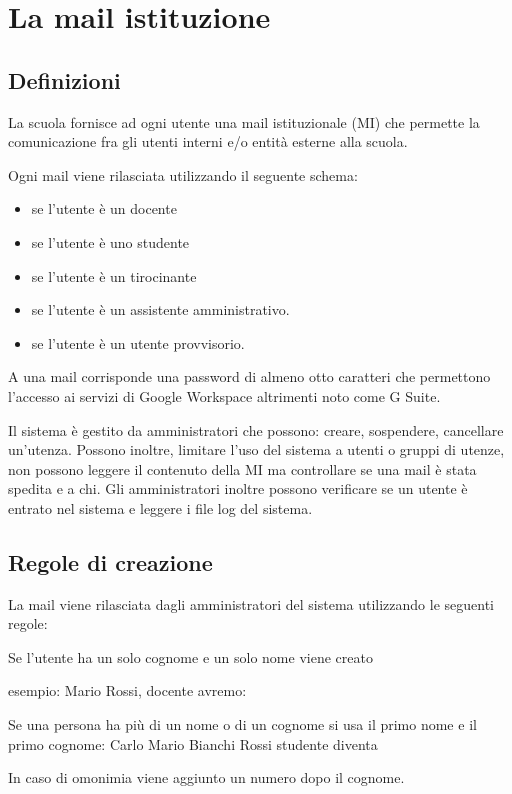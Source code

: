 \chapter{La mail istituzione}
\section{Definizioni}
La scuola fornisce ad ogni utente una mail istituzionale (MI) che permette 
la comunicazione fra gli utenti interni e/o entità esterne alla scuola.

Ogni mail viene rilasciata utilizzando il seguente schema:
\begin{itemize}
	\item {} se l'utente è un docente
	\item {} se l'utente è uno studente
	\item {} se l'utente è un 
	tirocinante
	\item {} se l'utente è un 
	assistente 
	amministrativo.
	\item {} se l'utente è un 
	utente provvisorio.
\end{itemize}

A una mail corrisponde una password di almeno otto caratteri che permettono
l'accesso ai servizi di  \textenglish{Google Workspace} altrimenti noto come \textenglish{G Suite}.

Il sistema è gestito da amministratori che possono: creare, sospendere, cancellare un'utenza. Possono inoltre, limitare l'uso del sistema a utenti o gruppi di utenze, non possono leggere il contenuto della MI ma controllare se una mail è stata spedita e a chi. Gli amministratori inoltre possono verificare se un utente è entrato nel sistema e leggere i file log del sistema.

\section{Regole di creazione} 
La mail viene rilasciata dagli amministratori del sistema utilizzando le seguenti 
regole:

Se l'utente ha un solo cognome e un solo nome viene creato
\begin{center}
\end{center}
esempio: Mario Rossi, docente avremo:
\begin{center}
\end{center}
Se una persona ha più di un nome o di un cognome si usa il primo nome e il  
primo cognome: Carlo Mario Bianchi Rossi studente diventa
\begin{center}
\end{center}
In caso di omonimia viene aggiunto un numero dopo il cognome.
